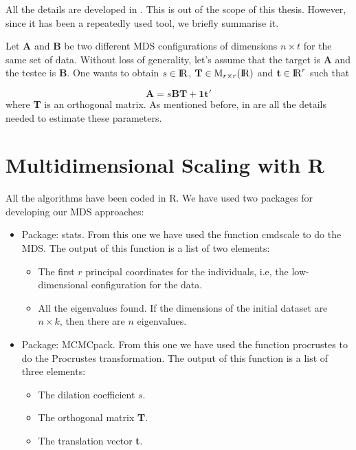 \documentclass[11pt]{report}
\begin{document}
\indent All the details are developed in  . This is out 
of the scope of this thesis. However, since it has been a repeatedly used tool, 
we briefly summarise it. 

\indent Let \textbf{A} and \textbf{B} be two different MDS configurations 
of dimensions $n \times t$ for the same set of data. Without loss of generality, 
let's assume that the target is \textbf{A} and the testee is \textbf{B}. 
One wants to obtain $s \in {\rm I\!R}$, 
$\mathbf{T} \in \mbox{M}_{r\times r}({\rm I\!R})$ and 
$\mathbf{t} \in {\rm I\!R}^r$ such that

\[
\mathbf{A} = s \mathbf{B} \mathbf{T} + \mathbf{1t}'
\]
where \textbf{T} is an orthogonal matrix. As mentioned before, 
in  are all the details needed to estimate 
these parameters.

\section{Multidimensional Scaling with \textsf{R}}

All the algorithms have been coded in \textsf{R}. We have used two 
packages for developing our MDS approaches:

\begin{itemize}
\item Package: \textsf{stats}. From this one we have used the function 
\textsf{cmdscale} to do the MDS. The output of this function is a list of 
two elements:
\begin{itemize}
\item The first $r$ principal coordinates for the individuals, i.e,
the low-dimensional configuration for the data.
\item All the eigenvalues found. If the dimensions of the initial dataset 
are $n \times k$, then there are $n$ eigenvalues.
\end{itemize}
\item Package: \textsf{MCMCpack}. From this one we have used the function 
\textsf{procrustes} to do the Procrustes transformation. The output of 
this function is a list of three elements:
\begin{itemize}
\item The dilation coefficient $s$.
\item The orthogonal matrix \textbf{T}.
\item The translation vector \textbf{t}.
\end{itemize}
\end{itemize}
\end{document}
